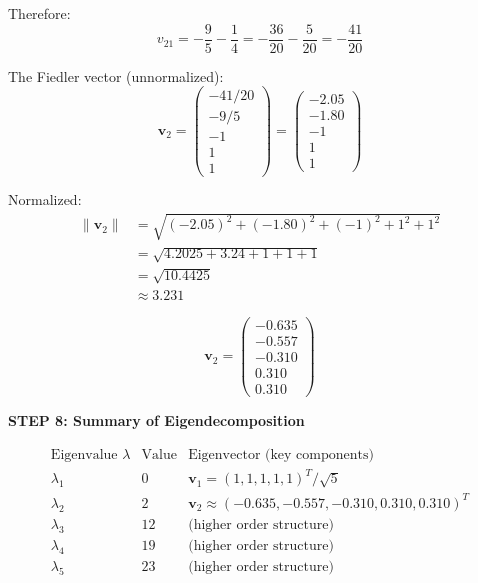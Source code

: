 \documentclass[12pt]{article}
\begin{document}
\begin{solution}
Therefore:
\[
v_{21} = -\frac{9}{5} - \frac{1}{4} = -\frac{36}{20} - \frac{5}{20} = -\frac{41}{20}
\]

The Fiedler vector (unnormalized):
\[
\mathbf{v}_2 = \begin{pmatrix} -41/20 \\ -9/5 \\ -1 \\ 1 \\ 1 \end{pmatrix} = \begin{pmatrix} -2.05 \\ -1.80 \\ -1 \\ 1 \\ 1 \end{pmatrix}
\]

Normalized:
\begin{align*}
\|\mathbf{v}_2\| &= \sqrt{(-2.05)^2 + (-1.80)^2 + (-1)^2 + 1^2 + 1^2} \\
&= \sqrt{4.2025 + 3.24 + 1 + 1 + 1} \\
&= \sqrt{10.4425} \\
&\approx 3.231
\end{align*}

\[
\boxed{\mathbf{v}_2 = \begin{pmatrix} -0.635 \\ -0.557 \\ -0.310 \\ 0.310 \\ 0.310 \end{pmatrix}}
\]

\textbf{STEP 8: Summary of Eigendecomposition}

\[
\begin{array}{c|c|l}
\text{Eigenvalue } \lambda & \text{Value} & \text{Eigenvector (key components)} \\
\hline
\lambda_1 & 0 & \mathbf{v}_1 = (1, 1, 1, 1, 1)^T / \sqrt{5} \\
\lambda_2 & 2 & \mathbf{v}_2 \approx (-0.635, -0.557, -0.310, 0.310, 0.310)^T \\
\lambda_3 & 12 & \text{(higher order structure)} \\
\lambda_4 & 19 & \text{(higher order structure)} \\
\lambda_5 & 23 & \text{(higher order structure)}
\end{array}
\]

\end{solution}
\end{document}
